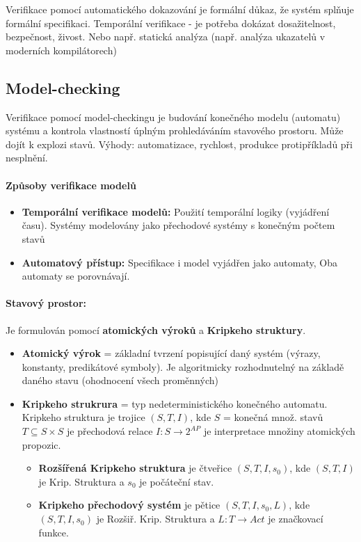 Verifikace pomocí automatického dokazování je formální důkaz, že systém splňuje formální specifikaci. Temporální verifikace - je potřeba dokázat dosažitelnost, bezpečnost, živost. Nebo např. statická analýza (např. analýza ukazatelů v moderních kompilátorech)

\subsection{Model-checking}
Verifikace pomocí model-checkingu je budování konečného modelu (automatu) systému a kontrola vlastností úplným prohledáváním stavového prostoru. Může dojít k explozi stavů. Výhody: automatizace, rychlost, produkce protipříkladů při nesplnění.

\paragraph{Způsoby verifikace modelů}

\begin{itemize}[itemsep=0px]
\item \textbf{Temporální verifikace modelů:} Použití temporální logiky (vyjádření času). Systémy modelovány jako přechodové systémy s konečným počtem stavů
\item \textbf{Automatový přístup:} Specifikace i model vyjádřen jako automaty, Oba automaty se porovnávají.
\end{itemize}

\paragraph{Stavový prostor:} Je formulován pomocí \textbf{atomických výroků} a \textbf{Kripkeho struktury}.

\begin{itemize}[itemsep=0px]
\item \textbf{Atomický výrok} = základní tvrzení popisující daný systém (výrazy, konstanty, predikátové symboly). Je algoritmicky rozhodnutelný na základě daného stavu (ohodnocení všech proměnných)
\item \textbf{Kripkeho strukrura} = typ nedeterministického konečného automatu. Kripkeho struktura je trojice $(S, T, I)$, kde $S$ = konečná množ. stavů $T \subseteq S\times S$ je přechodová relace $I: S \rightarrow 2^{AP}$ je interpretace množiny atomických propozic.
    \begin{itemize}[itemsep=0px]
    \item \textbf{Rozšířená Kripkeho struktura} je čtveřice $(S, T, I, s_0)$, kde $(S, T, I)$ je Krip. Struktura a $s_0$ je počáteční stav.
    \item \textbf{Kripkeho přechodový systém} je pětice $(S, T, I, s_0, L)$, kde $(S, T, I, s_0)$ je Rozšiř. Krip. Struktura a $L: T \rightarrow Act$ je značkovací funkce.
    \end{itemize}
\end{itemize}


